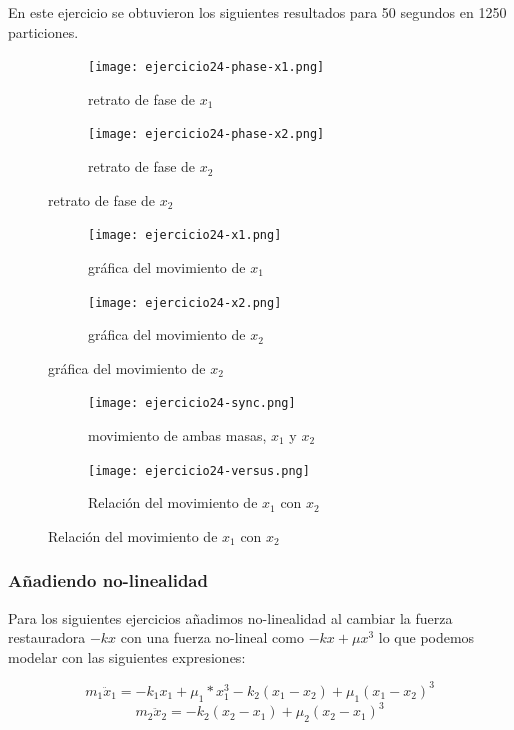 \documentclass{article}
\begin{document}
En este ejercicio se obtuvieron los siguientes resultados para 50 segundos en 1250 particiones.

\begin{figure}[ht!]
	\begin{subfigure}[b]{0.5\linewidth}
    \raggedleft
	\texttt{[image: ejercicio24-phase-x1.png]}
    \caption{retrato de fase de $x_1$}
	\end{subfigure}
	\begin{subfigure}[b]{0.5\linewidth}
    \raggedright
	\texttt{[image: ejercicio24-phase-x2.png]}
	\caption{retrato de fase de $x_2$}
    \end{subfigure}
\end{figure}

\begin{figure}[ht!]
	\begin{subfigure}[b]{0.5\linewidth}
    \raggedleft
	\texttt{[image: ejercicio24-x1.png]}
    \caption{gráfica del movimiento de $x_1$}
	\end{subfigure}
	\begin{subfigure}[b]{0.5\linewidth}
    \raggedright
	\texttt{[image: ejercicio24-x2.png]}
	\caption{gráfica del movimiento de $x_2$}
    \end{subfigure}
\end{figure}

\begin{figure}[ht!]
	\begin{subfigure}[b]{0.5\linewidth}
    \raggedleft
	\texttt{[image: ejercicio24-sync.png]}
    \caption{movimiento de ambas masas, $x_1$ y $x_2$}
	\end{subfigure}
	\begin{subfigure}[b]{0.5\linewidth}
    \raggedright
	\texttt{[image: ejercicio24-versus.png]}
	\caption{Relación del movimiento de $x_1$ con $x_2$}
    \end{subfigure}
\end{figure}

\newpage

\subsubsection{Añadiendo no-linealidad}

Para los siguientes ejercicios añadimos no-linealidad al cambiar la fuerza restauradora $-kx$ con una fuerza no-lineal como $-kx+\mu x^3$ lo que podemos modelar con las siguientes expresiones:

\[ m_1\ddot{x}_1=-k_1x_1+\mu_1*x_1^3-k_2(x_1-x_2)+\mu_1(x_1-x_2)^3 \]
\[ m_2\ddot{x}_2=-k_2(x_2-x_1)+\mu_2(x_2-x_1)^3 \]
\end{document}
